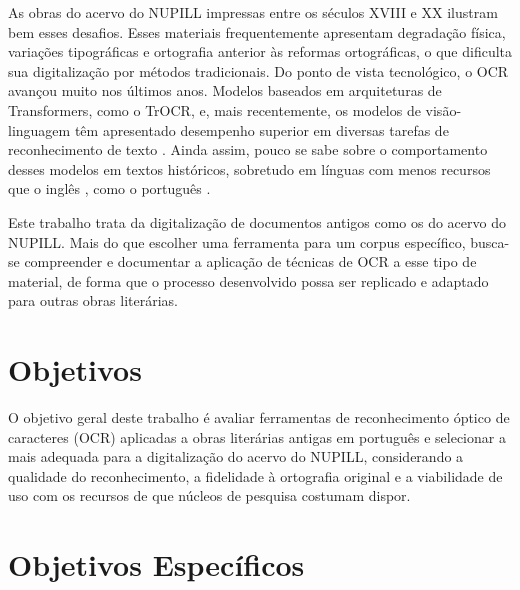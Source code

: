 \documentclass[noabntexcite,oneside]{ufsc-thesis-rn46-2019}
\begin{document}
As obras do acervo do NUPILL impressas entre os séculos XVIII e XX ilustram bem esses
desafios. Esses materiais frequentemente apresentam degradação física, variações
tipográficas e ortografia anterior às reformas ortográficas, o que dificulta sua
digitalização por métodos tradicionais.
Do ponto de vista tecnológico, o OCR avançou muito nos últimos anos.
Modelos baseados em arquiteturas de Transformers, como o TrOCR, e, mais recentemente, os
modelos de visão-linguagem têm apresentado desempenho superior em diversas tarefas de
reconhecimento de texto \cite{huang2021,qwen2025vl}.
Ainda assim, pouco se sabe sobre o comportamento desses modelos em textos históricos,
sobretudo em línguas com menos recursos que o inglês \cite{smith2019}, como o
português \cite{santos2023}.

Este trabalho trata da digitalização de documentos antigos como os do acervo do NUPILL.
Mais do que escolher uma ferramenta para um corpus específico, busca-se compreender e
documentar a aplicação de técnicas de OCR a esse tipo de material, de forma que o processo desenvolvido possa
ser replicado e adaptado para outras obras literárias.

\section{Objetivos}

O objetivo geral deste trabalho é avaliar ferramentas de reconhecimento óptico de
caracteres (OCR) aplicadas a obras literárias antigas em português e selecionar a mais
adequada para a digitalização do acervo do NUPILL, considerando a qualidade do
reconhecimento, a fidelidade à ortografia original e a viabilidade de uso com os recursos
de que núcleos de pesquisa costumam dispor.

\section{Objetivos Específicos}
\end{document}
